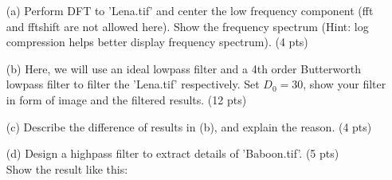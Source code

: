 \documentclass[11pt,letterpaper]{article}
\begin{document}
\begin{itemize}
\item[(a)] Perform DFT to 'Lena.tif' and center the low frequency component (fft and fftshift are not allowed here).  Show the frequency spectrum (Hint: log compression helps better display frequency spectrum). (4 pts)
\item[(b)] Here, we will use an ideal lowpass filter and a 4th order Butterworth lowpass filter to filter the 'Lena.tif' respectively. Set $D_0=30$, show your filter in form of image and the filtered results. (12 pts)
\item[(c)] Describe the difference of results in (b), and explain the reason.  (4 pts)
\item[(d)] Design a highpass filter to extract details of 'Baboon.tif'. (5 pts)\\Show the result like this:



\end{itemize}
\end{document}
